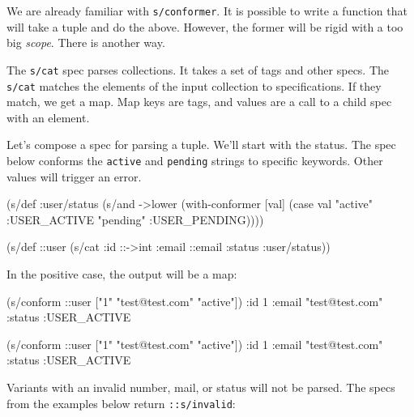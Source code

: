 We are already familiar with \verb|s/conformer|. It is possible to write a function that will take a tuple and do the above. However, the former will be rigid with a too big \emph{scope}. There is another way.


The \verb|s/cat| spec parses collections. It takes a set of tags and other specs. The \verb|s/cat| matches the elements of the input collection to specifications. If they match, we get a map. Map keys are tags, and values are a call to a child spec with an element.

Let's compose a spec for parsing a tuple. We'll start with the status. The spec below conforms the \verb|active| and \verb|pending| strings to specific keywords. Other values will trigger an error.

\begin{english}
  \begin{clojure}
(s/def :user/status
  (s/and ->lower
         (with-conformer [val]
           (case val
             "active"  :USER_ACTIVE
             "pending" :USER_PENDING))))

(s/def ::user
  (s/cat :id ::->int
         :email ::email
         :status :user/status))
  \end{clojure}
\end{english}

\noindent
In the positive case, the output will be a map:

\ifx\DEVICETYPE\MOBILE

\begin{english}
  \begin{clojure}
(s/conform ::user
  ["1" "test@test.com" "active"])
{:id 1
 :email "test@test.com"
 :status :USER_ACTIVE}
  \end{clojure}
\end{english}

\else

\begin{english}
  \begin{clojure}
(s/conform ::user ["1" "test@test.com" "active"])
{:id 1
 :email "test@test.com"
 :status :USER_ACTIVE}
  \end{clojure}
\end{english}

\fi

Variants with an invalid number, mail, or status will not be parsed. The specs from the examples below return \verb|::s/invalid|:

\ifx\DEVICETYPE\MOBILE

